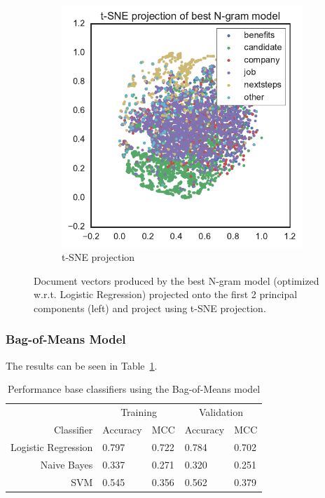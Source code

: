 \begin{figure}[h]
\begin{subfigure}[b]{0.48\textwidth}
      \includegraphics[width=\textwidth]{img/exp-vector-space/ngram-tsne.pdf}
      \caption{t-SNE projection}
\label{fig:ngram-tsne}
    \end{subfigure}
    \caption{Document vectors produced by the best N-gram model (optimized w.r.t. Logistic Regression) projected onto the first 2 principal components (left) and project using t-SNE projection.}
\label{fig:ngram}
\end{figure}

\subsubsection{Bag-of-Means Model}

 The results can be seen in Table~\ref{tab:Bag-Of-Means Results}.

\begin{table}[h]
  \begin{center}
  \begin{tabular}{ r | *2l | *2l }
    \toprule
     & \multicolumn{2}{c|}{Training} & \multicolumn{2}{|c}{Validation}\\
    Classifier & Accuracy & MCC & Accuracy & MCC \\
    \midrule
    Logistic Regression & 0.797 & 0.722 & 0.784 & 0.702 \\
    Naive Bayes         & 0.337 & 0.271 & 0.320 & 0.251 \\
    SVM                 & 0.545 & 0.356 & 0.562 & 0.379 \\
    \bottomrule
  \end{tabular}
  \caption{Performance base classifiers using the Bag-of-Means model}
\label{tab:Bag-Of-Means Results}
\end{center}
\end{table}

